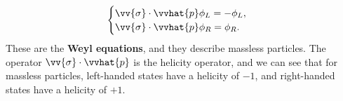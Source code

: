 \begin{itemize}
\begin{gather*}
        \end{gather*}
        \begin{equation}
            \begin{cases}
                \vv{\sigma}\cdot\vvhat{p} \phi_L = -\phi_L, \\
                \vv{\sigma}\cdot\vvhat{p} \phi_R = \phi_R.
            \end{cases}
        \end{equation}
        These are the \textbf{Weyl equations}, and they describe massless particles. The operator $\vv{\sigma}\cdot\vvhat{p}$ is the helicity operator, and we can see that for massless particles, left-handed states have a helicity of $-1$, and right-handed states have a helicity of $+1$.
\end{itemize}